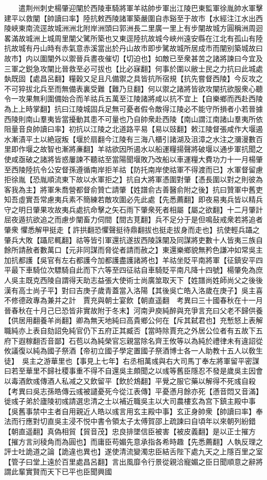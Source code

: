 　　遣荆州刺史楊肇迎闡於西陵車騎將軍羊祜帥步軍出江陵巴東監軍徐胤帥水軍擊建平以救闡【帥讀曰率】陸抗敕西陵諸軍築嚴圍自赤谿至于故市【水經注江水出西陵峽東南流逕故城洲洲北附岸洲頭曰郭洲長二里廣一里上有步闡故城方圓稱洲周迴畧滿故城洲上城周里闡父騭所築也又東逕陸抗故城今峽州遠安縣在江北有孤山有陸抗故城有丹山時有赤氣意赤溪當出於丹山故市即步騭故城所居成市而闡别築城故曰故市】内以圍闡外以禦晉兵晝夜催切【切迫也】如敵已至衆甚苦之諸將諫曰今宜及三軍之鋭急攻闡比晉救至必可拔也【比必寐翻】何事於圍以敝士民之力抗曰此城處埶既固【處昌呂翻】糧穀又足且凡備禦之具皆抗所宿規【抗先嘗督西陵】今反攻之不可猝拔北兵至而無備表裏受難【難乃旦翻】何以禦之諸將皆欲攻闡抗欲服衆心聽令一攻果無利圍備始合而羊祜兵五萬至江陵諸將咸以抗不宜上【自樂鄉而西赴西陵為上上時掌翻】抗曰江陵城固兵足無可憂者假令敵得江陵必不能守所損者小若晉據西陵則南山羣夷皆當擾動其患不可量也乃自帥衆赴西陵【南山謂江南諸山羣夷所依阻量音良帥讀曰率】初抗以江陵之北道路平易【易以豉翻】敕江陵督張咸作大堰遏水漸漬平土以絶宼叛【堰於扇翻今江陵有三海八櫃引諸湖及沮漳之水注之瀰漫數百里即作堰之故智也漸將亷翻】羊祜欲因所遏水以船運糧揚聲將破堰以通步軍抗聞之使咸亟破之諸將皆惑屢諫不聽祜至當陽聞堰敗乃改船以車運糧大費功力十一月楊肇至西陵陸抗令公安督孫遵循南岸拒羊祜【防托南岸使祜軍不得渡而已】水軍督留慮拒徐胤【恐胤順流東下故以水軍拒之】抗自大將軍憑圍對肇【憑長圍以對之則彼為客我為主】將軍朱喬營都督俞贊亡請肇【姓譜俞古善醫俞附之後】抗曰贊軍中舊吏知吾虛實吾常慮夷兵素不簡練若敵攻圍必先此處【先悉薦翻】即夜易夷兵皆以精兵守之明日肇果攻故夷兵處抗命擊之矢石雨下肇衆死者相屬【屬之欲翻】十二月肇計屈夜遁抗欲追之而慮步闡畜力伺間【間古莧翻】兵不足分于是但鳴鼔戒衆若將追者肇衆懼悉解甲挺走【許拱翻恐懼聲挺待鼎翻拔也挺走拔身而走也】抗使輕兵躡之肇兵大敗【躡尼輒翻】祜等皆引軍還抗遂拔西陵誅闡及同謀將吏數十人皆夷三族自餘所請赦者數萬口【元非同謀而脅從者請而赦之】東還樂鄉貌無矜色謙冲如常吳主加抗都護【吳官有左右都護今加都護盡護諸將也】羊祜坐貶平南將軍【征鎮安平四平最下車騎位次驃騎自此而下六等至四征祜自車騎貶平南凡降十四號】楊肇免為庶人吳主既克西陵自謂得天助志益張大使術士尚廣筮取天下【姓譜尚姓師尚父之後後漢有高士尚子平】對曰吉庚子歲青蓋當入洛陽【其後吳亡皓入洛歲在庚子】吳主喜不修德政專為兼并之計　賈充與朝士宴飲【朝直遥翻　考異曰三十國春秋在十一月晉春秋在十月己巳恐皆非實故附于冬末】河南尹庾純醉與充爭言充曰父老不歸供養【供居用翻養羊尚翻】卿為無天地純曰高貴鄉公何在【斥其弑君也】充慙怒上表解職純亦上表自劾詔免純官仍下五府正其臧否【當時除賈充之外居公位者有五故下五府下遐稼翻否音鄙】石苞以為純榮官忘親當除名齊王攸等以為純於禮律未有違詔從攸議復以純為國子祭酒【帝初立國子學定置國子祭酒博士各一人助教十五人以敎生徒】　吳主之游華里也【事見上七年】右丞相萬彧與右大司馬丁奉左將軍留平密謀曰若至華里不歸社稷事重不得不自還吳主頗聞之以彧等舊臣隱忍不發是歲吳主因會以毒酒飲彧傳酒人私减之又飲留平【飲於鴆翻】平覺之服它藥以解得不死彧自殺　【考異曰吳志孫皓傳云彧被譴憂死今從江表傳】平憂懣月餘亦死【懣音悶又音滿】徙彧子弟於廬陵初彧請選忠清之士以補近職吳主以大司農樓玄為宫下鎮主殿中事【吳舊事禁中主者自用親近人皓以彧言用玄主殿中事】玄正身帥衆【帥讀曰率】奉法而行應對切直吳主浸不悦中書令領太子太傅賀邵上疏諫曰自頃年以來朝列紛錯【朝直遥翻】真偽相貿【貿音茂】忠良排墜信臣被害【被皮義翻】是以正士摧方【摧方言刓稜角而為圓也】而庸臣苟媚先意承指各希時趣【先悉薦翻】人執反理之評士吐詭道之論【詭違也異也】遂使清流變濁忠臣結舌陛下處九天之上隱百里之室【管子曰堂上遠於百里處昌呂翻】言出風靡令行景從親洽寵媚之臣日聞順意之辭將謂此輩實賢而天下已平也臣聞興國